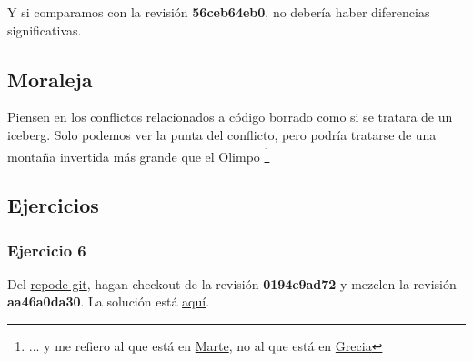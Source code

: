 Y si comparamos con la revisión {\bf 56ceb64eb0}, no debería haber diferencias significativas.

\subsection{Moraleja}
Piensen en los conflictos relacionados a código borrado como si se tratara de un iceberg. Solo podemos ver la
punta del conflicto, pero podría tratarse de una montaña invertida más grande que el Olimpo 
\footnote{... y me refiero al que está en \href{https://es.wikipedia.org/wiki/Monte_Olimpo_(Marte)}{Marte}, no al que está
en \href{https://es.wikipedia.org/wiki/Olimpo}{Grecia}}

\subsection{Ejercicios}
\subsubsection{Ejercicio 6}
Del \hyperref[git_repo]{repode git}, hagan checkout de la revisión {\bf 0194c9ad72} y mezclen la revisión {\bf aa46a0da30}.
La solución está \hyperref[exercise_06]{aquí}.

